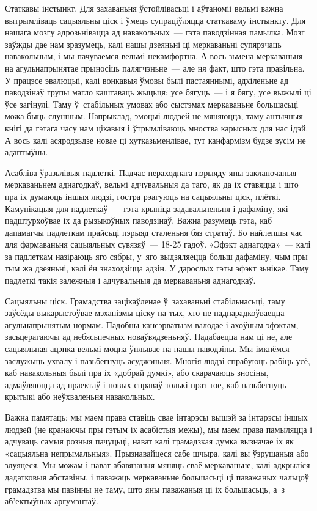 Статкавы інстынкт. Для захаваньня ўстойлівасьці і аўтаноміі вельмі важна вытрымліваць сацыяльны ціск і ўмець супраціўляцца статкаваму інстынкту. Для нашага мозгу адрозьнівацца ад навакольных~--- гэта паводзінная памылка. Мозг заўжды дае нам зразумець, калі нашы дзеяньні ці меркаваньні супярэчаць навакольным, і мы пачуваемся вельмі некамфортна. А вось зьмена меркаваньня на агульнапрынятае прыносіць палягчэньне~--- але ня факт, што гэта правільна. У працэсе эвалюцыі, калі вонкавыя ўмовы былі пастаяннымі, адхіленьне ад паводзінаў групы магло каштаваць жыцьця: усе бягуць~--- і я бягу, усе выжылі ці ўсе загінулі. Таму ў~стабільных умовах або сыстэмах меркаваньне большасьці можа быць слушным. Напрыклад, эмоцыі людзей не мяняюцца, таму антычныя кнігі да гэтага часу нам цікавыя і ўтрымліваюць мноства карысных для нас ідэй. А вось калі асяродзьдзе новае ці хутказьменлівае, тут канфармізм будзе зусім не адаптыўны.

Асабліва ўразьлівыя падлеткі. Падчас пераходнага пэрыяду яны заклапочаныя меркаваньнем аднагодкаў, вельмі адчувальныя да таго, як да іх ставяцца і што пра іх думаюць іншыя людзі, гостра рэагуюць на сацыяльны ціск, плёткі. Камунікацыя для падлеткаў~--- гэта крыніца задавальненьня і дафаміну, які падштурхоўвае іх да рызыкоўных паводзінаў. Важна разумець гэта, каб дапамагчы падлеткам прайсьці пэрыяд сталеньня бяз стратаў. Бо найлепшы час для фармаваньня сацыяльных сувязяў~--- 18-25 гадоў. «Эфэкт аднагодка»~--- калі за падлеткам назіраюць яго сябры, у~яго выдзяляецца больш дафаміну, чым пры тым жа дзеяньні, калі ён знаходзіцца адзін. У дарослых гэты эфэкт зьнікае. Таму падлеткі такія залежныя і адчувальныя да меркаваньня аднагодкаў.

Сацыяльны ціск. Грамадства зацікаўленае ў~захаваньні стабільнасьці, таму заўсёды выкарыстоўвае мэханізмы ціску на тых, хто не падпарадкоўваецца агульнапрынятым нормам. Падобны кансэрватызм валодае і ахоўным эфэктам, засьцерагаючы ад небясьпечных новаўвядзеньняў. Падабаецца нам ці не, але сацыяльная ацэнка вельмі моцна ўплывае на нашы паводзіны. Мы імкнёмся заслужыць ухвалу і пазьбегнуць асуджэньня. Многія людзі спрабуюць рабіць усё, каб навакольныя былі пра іх «добрай думкі», або скарачаюць зносіны, адмаўляюцца ад праектаў і новых справаў толькі праз тое, каб пазьбегнуць крытыкі або неўхваленьня навакольных.

Важна памятаць: мы маем права ставіць свае інтарэсы вышэй за інтарэсы іншых людзей (не кранаючы пры гэтым іх асабістыя межы), мы маем права памыляцца і адчуваць самыя розныя пачуцьці, нават калі грамадзкая думка вызначае іх як «сацыяльна непрымальныя». Прызнавайцеся сабе шчыра, калі вы ўзрушаныя або злуяцеся. Мы можам і нават абавязаныя мяняць сваё меркаваньне, калі адкрыліся дадатковыя абставіны, і паважаць меркаваньне большасьці ці паважаных чальцоў грамадзтва мы павінны не таму, што яны паважаныя ці іх большасьць, а~з аб'ектыўных аргумэнтаў.

